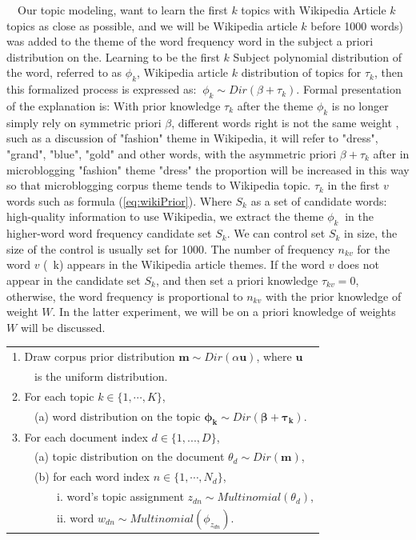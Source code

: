 \documentclass[conference,compsoc]{IEEEtran}
\begin{document}
\ \ Our topic modeling, want to learn the first \(k\) topics with Wikipedia Article \(k\) topics as close as possible, and we will be Wikipedia article \(k\) before 1000 words) was added to the theme of the word frequency word in the subject a priori distribution on the.
Learning to be the first \(k\) Subject polynomial distribution of the word, referred to as \(\phi_k \), Wikipedia article \(k \) distribution of topics for \(\tau_k \), then this formalized process is expressed as: \(\ \phi_k \sim Dir(\beta + \tau_k) \).
Formal presentation of the explanation is: With prior knowledge \(\tau_k \) after the theme \(\phi_k \) is no longer simply rely on symmetric priori \(\beta \), different words right is not the same weight , such as a discussion of "fashion" theme in Wikipedia, it will refer to "dress", "grand", "blue", "gold" and other words, with the asymmetric priori \(\beta + \tau_k \) after in microblogging "fashion" theme "dress" the proportion will be increased in this way so that microblogging corpus theme tends to Wikipedia topic.
\(\tau_k \) in the first \(v \) words such as formula (\ref{eq:wikiPrior}).
Where \(S_k \) as a set of candidate words: high-quality information to use Wikipedia, we extract the theme \(\phi_k \ \) in the higher-word word frequency candidate set \(S_k \).
We can control set \(S_k \) in size, the size of the control is usually set for 1000.
The number of frequency \(n_{kv} \) for the word \(v \) (\ k) appears in the Wikipedia article themes.
If the word \(v \) does not appear in the candidate set \(S_k \), and then set a priori knowledge \(\tau_{kv} = 0 \), otherwise, the word frequency is proportional to \(n_{kv} \) with the prior knowledge of weight \(W\).
In the latter experiment, we will be on a priori knowledge of weights \(W \) will be discussed. 

\begin{table}[!htbp]
\begin{tabular}{l}
1. Draw corpus prior distribution \(\bm{m} \sim Dir(\alpha \bm{u})\), where \(\bm{u}\)\\
 \ \ \ \ is the uniform distribution. \\
2. For each topic \(k \in \{1,\cdots,K\}\),\\
\ \ \ \ (a) word distribution on the topic \(\bm{\phi_k} \sim Dir(\bm{\beta}+ \bm{\tau_k})\). \\
    
3. For each document index \(d \in \{1,...,D\}\), \\
\ \ \ \ (a) topic distribution on the document \(\theta_d \sim Dir(\bm{m})\), \\
\ \ \ \ (b) for each word index \(n \in \{1,\cdots,N_d\}\),\\
\ \ \ \ \ \ \ \ i. word's topic assignment \(z_{dn} \sim Multinomial(\theta_d)\), \\
\ \ \ \ \ \ \ \ ii. word \(w_{dn} \sim Multinomial(\phi_{z_{dn}})\). \\
\end{tabular}
\end{table}
\end{document}
